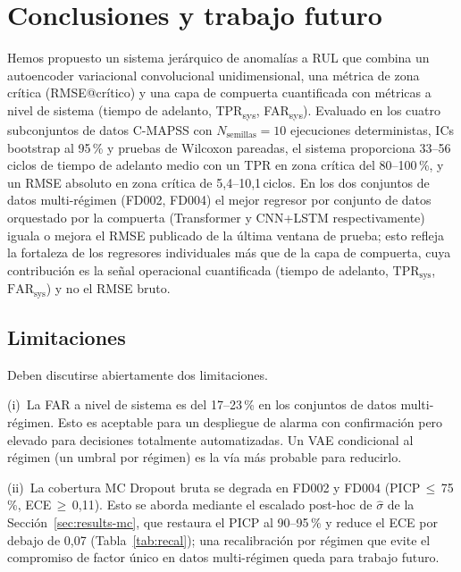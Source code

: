 \documentclass[5p,times,authoryear]{elsarticle}
\begin{document}
\section{Conclusiones y trabajo futuro}\label{sec:conclusions}

Hemos propuesto un sistema jerárquico de anomalías a RUL que combina un autoencoder variacional convolucional unidimensional, una métrica de zona crítica (RMSE@crítico) y una capa de compuerta cuantificada con métricas a nivel de sistema (tiempo de adelanto, TPR\textsubscript{sys}, FAR\textsubscript{sys}). Evaluado en los cuatro subconjuntos de datos C-MAPSS con $N_{\mathrm{semillas}}{=}10$ ejecuciones deterministas, ICs bootstrap al 95\,\% y pruebas de Wilcoxon pareadas, el sistema proporciona 33--56\,ciclos de tiempo de adelanto medio con un TPR en zona crítica del 80--100\,\%, y un RMSE absoluto en zona crítica de 5{,}4--10{,}1\,ciclos. En los dos conjuntos de datos multi-régimen (FD002, FD004) el mejor regresor por conjunto de datos orquestado por la compuerta (Transformer y CNN+LSTM respectivamente) iguala o mejora el RMSE publicado de la última ventana de prueba; esto refleja la fortaleza de los regresores individuales más que de la capa de compuerta, cuya contribución es la señal operacional cuantificada (tiempo de adelanto, $\mathrm{TPR}_{\mathrm{sys}}$, $\mathrm{FAR}_{\mathrm{sys}}$) y no el RMSE bruto.

\subsection{Limitaciones}\label{sec:limitations}

Deben discutirse abiertamente dos limitaciones.

(i)~La FAR a nivel de sistema es del 17--23\,\% en los conjuntos de datos multi-régimen. Esto es aceptable para un despliegue de alarma con confirmación pero elevado para decisiones totalmente automatizadas. Un VAE condicional al régimen (un umbral por régimen) es la vía más probable para reducirlo.

(ii)~La cobertura MC Dropout bruta se degrada en FD002 y FD004 (PICP\,$\le$\,75\,\%, ECE\,$\ge$\,0{,}11). Esto se aborda mediante el escalado post-hoc de $\hat\sigma$ de la Sección~\ref{sec:results-mc}, que restaura el PICP al 90--95\,\% y reduce el ECE por debajo de 0{,}07 (Tabla~\ref{tab:recal}); una recalibración por régimen que evite el compromiso de factor único en datos multi-régimen queda para trabajo futuro.
\end{document}
